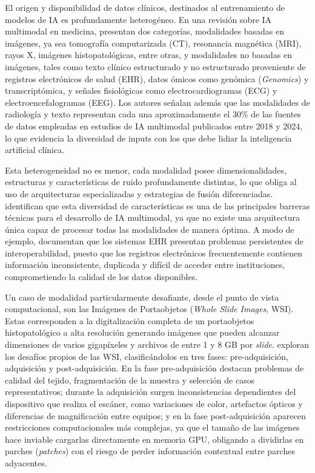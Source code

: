 El origen y disponibilidad de datos clínicos, destinados al entrenamiento de modelos de IA es 
profundamente heterogéneo. En una revisión sobre IA multimodal en medicina, 
\textcite{schouten2024} presentan dos categorías, modalidades basadas en imágenes, ya sea tomografía 
computarizada (CT), resonancia magnética (MRI), rayos X, imágenes histopatológicas, entre otras, y 
modalidades no basadas en imágenes, tales como texto clínico estructurado y no estructurado proveniente 
de registros electrónicos de salud (EHR), datos ómicos como genómica (\textit{Genomics}) y transcriptómica, y señales 
fisiológicas como electrocardiogramas (ECG) y electroencefalogramas (EEG). Los autores señalan 
además que las modalidades de radiología y texto representan cada una aproximadamente el 30\% de 
las fuentes de datos empleadas en estudios de IA multimodal publicados entre 2018 y 2024, lo que 
evidencia la diversidad de inputs con los que debe lidiar la inteligencia artificial clínica.

Esta heterogeneidad no es menor, cada modalidad posee dimensionalidades, estructuras 
y características de ruido profundamente distintas, lo que obliga al uso de arquitecturas especializadas 
y estrategias de fusión diferenciadas. \textcite{schouten2024} identifican que esta diversidad de 
características es una de las principales barreras técnicas para el desarrollo de IA multimodal, ya 
que no existe una arquitectura única capaz de procesar todas las modalidades de manera óptima.
A modo de ejemplo, \textcite{Makhni2025} documentan que los sistemas EHR presentan 
problemas persistentes de interoperabilidad, puesto que los registros electrónicos frecuentemente contienen 
información inconsistente, duplicada y difícil de acceder entre instituciones, comprometiendo la 
calidad de los datos disponibles.

Un caso de modalidad particularmente desafiante, desde el punto de vista computacional, son las Imágenes de 
Portaobjetos (\textit{Whole Slide Images}, WSI). Estas corresponden a la digitalización completa de un 
portaobjetos histopatológico a alta resolución generando imágenes que pueden alcanzar dimensiones de varios 
gigapíxeles y archivos de entre 1 y 8 GB por \textit{slide}. \textcite{Basak2023} exploran los desafíos propios de las WSI, clasificándolos en tres fases: pre-adquisición, adquisición y post-adquisición. 
En la fase pre-adquisición destacan problemas de calidad del tejido, fragmentación de la muestra y selección de casos representativos;
 durante la adquisición surgen inconsistencias dependientes del dispositivo que realiza el escáner, como variaciones de color, artefactos ópticos y 
 diferencias de magnificación entre equipos; y en la fase post-adquisición aparecen restricciones computacionales más complejas, ya que el 
 tamaño de las imágenes hace inviable cargarlas directamente en memoria GPU, obligando a dividirlas en parches (\textit{patches}) con el riesgo 
 de perder información contextual entre parches adyacentes.

